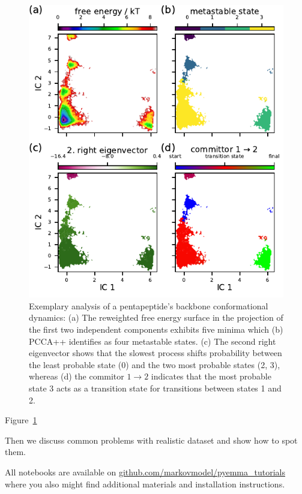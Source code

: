 \documentclass[9pt,tutorial,lineno,onehalfspacing]{livecoms}
\newcommand{\githubrepository}{\url{github.com/markovmodel/pyemma_tutorials}}
\begin{document}
\begin{figure}
\includegraphics{figure_3}
\caption{Exemplary analysis of a pentapeptide's backbone conformational dynamics: (a) The reweighted free energy surface in the projection of the first two independent components exhibits five minima which (b) PCCA++ identifies as four metastable states. (c) The second right eigenvector shows that the slowest process shifts probability between the least probable state (0) and the two most probable states (2, 3), whereas (d) the commitor $1\to2$ indicates that the most probable state 3 acts as a transition state for transitions between states 1 and 2.}
\label{fig:msm-analysis}
\end{figure}

Figure~\ref{fig:msm-analysis}

Then we discuss common problems with realistic dataset and show how to spot them.

All notebooks are available on \githubrepository{} where you also might find additional materials and installation instructions.
\end{document}
